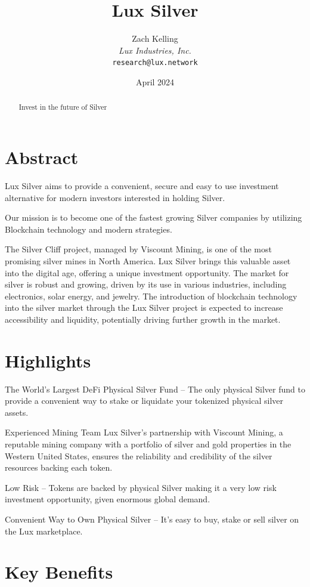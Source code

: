 \documentclass[11pt]{article}
\title{Lux Silver}
\author{Zach Kelling\\\textit{Lux Industries, Inc.}\\\texttt{research@lux.network}}
\date{April 2024}
\begin{document}
\luxcoverpage

\begin{abstract}
Invest in the future of Silver
\end{abstract}

\tableofcontents
\newpage


\section{Abstract}

Lux Silver aims to provide a convenient, secure and easy to use investment alternative for modern investors interested in holding Silver.


Our mission is to become one of the fastest growing Silver companies by utilizing Blockchain technology and modern strategies.


The Silver Cliff project, managed by Viscount Mining, is one of the most promising silver mines in North America. Lux Silver brings this valuable asset into the digital age, offering a unique investment opportunity. The market for silver is robust and growing, driven by its use in various industries, including electronics, solar energy, and jewelry. The introduction of blockchain technology into the silver market through the Lux Silver project is expected to increase accessibility and liquidity, potentially driving further growth in the market.


\section{Highlights}

The World's Largest DeFi Physical Silver Fund -- The only physical Silver fund to provide a convenient way to stake or liquidate your tokenized physical silver assets.


Experienced Mining Team Lux Silver's partnership with Viscount Mining, a reputable mining company with a portfolio of silver and gold properties in the Western United States, ensures the reliability and credibility of the silver resources backing each token.


Low Risk -- Tokens are backed by physical Silver making it a very low risk investment opportunity, given enormous global demand.


Convenient Way to Own Physical Silver -- It's easy to buy, stake or sell silver on the Lux marketplace.


\section{Key Benefits}
\end{document}
